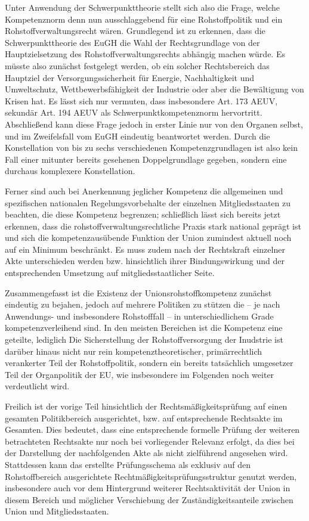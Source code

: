 \documentclass[12pt,a4paper,oneside]{book} %
\begin{document}
	Unter Anwendung der Schwerpunkttheorie stellt sich also die Frage, welche Kompetenznorm denn nun ausschlaggebend für eine Rohstoffpolitik und ein Rohstoffverwaltungsrecht wären. Grundlegend ist zu erkennen, dass die Schwerpunkttheorie des EuGH die Wahl der Rechtsgrundlage von der Hauptzielsetzung des Rohstoffverwaltungsrechts abhängig machen würde. Es müsste also zunächst festgelegt werden, ob ein solcher Rechtsbereich das Hauptziel der Versorgungssicherheit für Energie, Nachhaltigkeit und Umweltschutz, Wettbewerbsfähigkeit der Industrie oder aber die Bewältigung von Krisen hat. Es lässt sich nur vermuten, dass insbesondere Art. 173 AEUV, sekundär Art. 194 AEUV als Schwerpunktkompetenznorm hervortritt. Abschließend kann diese Frage jedoch in erster Linie nur von den Organen selbst, und im Zweifelsfall vom EuGH eindeutig beantwortet werden. Durch die Konstellation von bis zu sechs verschiedenen Kompetenzgrundlagen ist also kein Fall einer mitunter bereits gesehenen Doppelgrundlage gegeben, sondern eine durchaus komplexere Konstellation. 
	
	Ferner sind auch bei Anerkennung jeglicher Kompetenz die allgemeinen und spezifischen nationalen Regelungsvorbehalte der einzelnen Mitgliedsstaaten zu beachten, die diese Kompetenz begrenzen; schließlich lässt sich bereits jetzt erkennen, dass die rohstoffverwaltungsrechtliche Praxis stark national geprägt ist und sich die kompetenzausübende Funktion der Union zumindest aktuell noch auf ein Minimum beschränkt. Es muss zudem nach der Rechtskraft einzelner Akte unterschieden werden bzw. hinsichtlich ihrer Bindungswirkung und der entsprechenden Umsetzung auf mitgliedsstaatlicher Seite.
	
	Zusammengefasst ist die Existenz der Unionsrohstoffkompetenz zunächst eindeutig zu bejahen, jedoch auf mehrere Politiken zu stützen die -- je nach Anwendungs- und insbesondere Rohstofffall -- in unterschiedlichem Grade kompetenzverleihend sind. In den meisten Bereichen ist die Kompetenz eine geteilte, lediglich %
	Die Sicherstellung der Rohstoffversorgung der Inudstrie ist darüber hinaus nicht nur rein kompetenztheoretischer, primärrechtlich verankerter Teil der Rohstoffpolitik, sondern ein bereits tatsächlich umgesetzer Teil der Organpolitik der EU, wie insbesondere im Folgenden noch weiter verdeutlicht wird.
	
Freilich ist der vorige Teil hinsichtlich der Rechtsmäßigkeitsprüfung auf einen gesamten Politikbereich ausgerichtet, bzw. auf entsprechende Rechtsakte im Gesamten. Dies bedeutet, dass eine entsprechende formelle Prüfung der weiteren betrachteten Rechtsakte nur noch bei vorliegender Relevanz erfolgt, da dies bei der Darstellung der nachfolgenden Akte als nicht zielführend angesehen wird. Stattdessen kann das erstellte Prüfungsschema als exklusiv auf den Rohstoffbereich ausgerichtete Rechtmäßigkeitsprüfungsstruktur genutzt werden, insbesondere auch vor dem Hintergrund weiterer Rechtsaktivität der Union in diesem Bereich und möglicher Verschiebung der Zuständigkeitsanteile zwischen Union und Mitgliedsstaaten.
\end{document}
